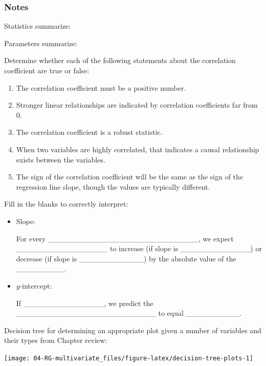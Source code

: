 \documentclass[
]{report}
\newcommand{\rgs}{\vspace{12pt}} %
\begin{document}
\hypertarget{notes-10}{%
\subsubsection*{Notes}\label{notes-10}}

Statistics summarize:
\rgs

Parameters summarize:
\rgs

Determine whether each of the following statements about the correlation coefficient are true or false:

\begin{enumerate}
\def\labelenumi{\arabic{enumi}.}
\item
  The correlation coefficient must be a positive number.
\item
  Stronger linear relationships are indicated by correlation coefficients far from 0.
\item
  The correlation coefficient is a robust statistic.
\item
  When two variables are highly correlated, that indicates a causal relationship exists between the variables.
\item
  The sign of the correlation coefficient will be the same as the sign of the regression line slope, though the values are typically different.
\end{enumerate}

Fill in the blanks to correctly interpret:

\begin{itemize}
\item
  Slope:

  For every \_\_\_\_\_\_\_\_\_\_\_\_\_\_\_\_\_\_\_\_\_\_\_\_\_\_\_\_, we expect \_\_\_\_\_\_\_\_\_\_\_\_\_\_\_\_\_ to increase (if slope is \_\_\_\_\_\_\_\_\_\_\_\_\_) or decrease (if slope is \_\_\_\_\_\_\_\_\_\_\_\_) by the absolute value of the \_\_\_\_\_\_\_\_\_.
\item
  \(y\)-intercept:

  If \_\_\_\_\_\_\_\_\_\_\_\_\_\_\_, we predict the \_\_\_\_\_\_\_\_\_\_\_\_\_\_\_\_\_\_\_\_\_\_\_\_\_\_ to equal \_\_\_\_\_\_\_\_\_\_.
\end{itemize}

Decision tree for determining an appropriate plot given a number of variables and their types from Chapter review:

\begin{center}\texttt{[image: 04-RG-multivariate\_files/figure-latex/decision-tree-plots-1]} \end{center}
\end{document}
